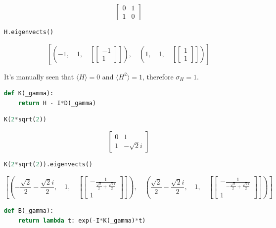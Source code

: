 \[\left[\begin{matrix}0 & 1\\1 & 0\end{matrix}\right]\]

\begin{lstlisting}[language=Python]
H.eigenvects()
\end{lstlisting}

\[\left [ \left ( -1, \quad 1, \quad \left [ \left[\begin{matrix}-1\\1\end{matrix}\right]\right ]\right ), \quad \left ( 1, \quad 1, \quad \left [ \left[\begin{matrix}1\\1\end{matrix}\right]\right ]\right )\right ]\]

It's manually seen that \(\langle H \rangle = 0\) and
\(\langle H^2 \rangle = 1\), therefore \(\sigma_{H} = 1\).

\begin{lstlisting}[language=Python]
def K(_gamma):
    return H - I*D(_gamma)
\end{lstlisting}

\begin{lstlisting}[language=Python]
K(2*sqrt(2))
\end{lstlisting}

\[\left[\begin{matrix}0 & 1\\1 & - \sqrt{2} i\end{matrix}\right]\]

\begin{lstlisting}[language=Python]
K(2*sqrt(2)).eigenvects()
\end{lstlisting}

\[\left [ \left ( - \frac{\sqrt{2}}{2} - \frac{\sqrt{2} i}{2}, \quad 1, \quad \left [ \left[\begin{matrix}- \frac{1}{\frac{\sqrt{2}}{2} + \frac{\sqrt{2} i}{2}}\\1\end{matrix}\right]\right ]\right ), \quad \left ( \frac{\sqrt{2}}{2} - \frac{\sqrt{2} i}{2}, \quad 1, \quad \left [ \left[\begin{matrix}- \frac{1}{- \frac{\sqrt{2}}{2} + \frac{\sqrt{2} i}{2}}\\1\end{matrix}\right]\right ]\right )\right ]\]

\begin{lstlisting}[language=Python]
def B(_gamma):
    return lambda t: exp(-I*K(_gamma)*t)
\end{lstlisting}


